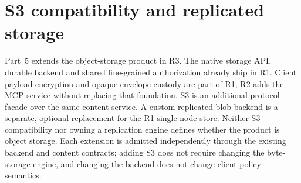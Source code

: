 \documentclass[11pt,a4paper]{article}
\begin{document}

\section{S3 compatibility and replicated storage}\label{sec:storage}
Part~5 extends the object-storage product in R3. The native storage API, durable backend and shared fine-grained authorization already ship in R1. Client payload encryption and opaque envelope custody are part of R1; R2 adds the MCP service without replacing that foundation. S3 is an additional protocol facade over the same content service. A custom replicated blob backend is a separate, optional replacement for the R1 single-node store. Neither S3 compatibility nor owning a replication engine defines whether the product is object storage. Each extension is admitted independently through the existing backend and content contracts; adding S3 does not require changing the byte-storage engine, and changing the backend does not change client policy semantics.
\end{document}
